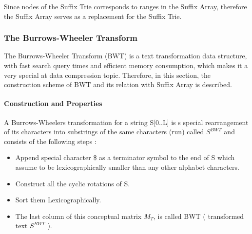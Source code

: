 \documentclass[11pt,a4paper]{report}
\begin{document}
Since nodes of the Suffix Trie corresponds to ranges in the Suffix 
Array, therefore the Suffix Array serves as a replacement for 
the Suffix Trie.

\subsubsection{The Burrows-Wheeler Transform} 
\label{The Burrows-Wheeler Transform}


The Burrows-Wheeler Transform (BWT) is a text transformation data structure, 
with fast search query times and efficient memory consumption, which makes 
it a very special at data compression topic.
Therefore, in this section, the construction scheme of BWT and its relation 
with Suffix Array is described.\\





\paragraph{Construction and Properties}

A Burrows-Wheelers transformation for a string S[0..L] is s special rearrangement 
of its characters into substrings of the same characters (run) called $S^{BWT}$ 
and consists of the following steps \cite{bwt}:

\begin{itemize} 
	\item Append special character \$ as a terminator symbol to the end of S 
	which assume to be lexicographically smaller than any other alphabet 
	characters.
	\item  Construct all the cyclic rotations of S.
	\item  Sort them Lexicographically.
	\item The last column of this conceptual matrix \emph{$M_{T}$}, is called 
	BWT ( transformed text $S^{BWT}$ ).
\end{itemize}
\end{document}
